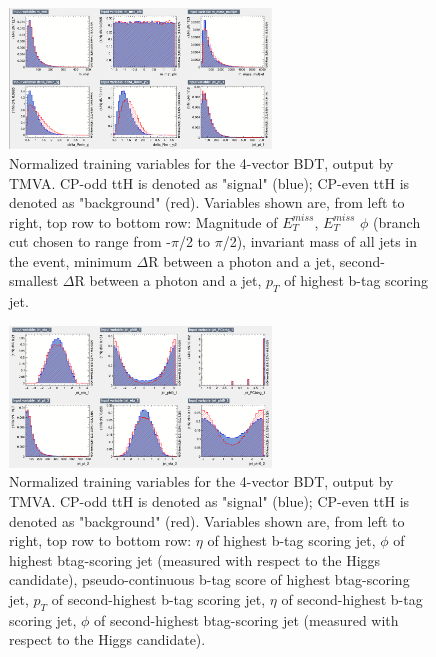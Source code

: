 \begin{figure}[htbp]
  \centering
  \includegraphics[width=0.62\textwidth]{figures/TMVABDTStudies/had-vbls4vec/had4vecvbls2.png}
  \caption{Normalized training variables for the 4-vector BDT, output by TMVA. CP-odd ttH is denoted as "signal" (blue); CP-even ttH is denoted as "background" (red). Variables shown are, from left to right, top row to bottom row: Magnitude of $E_T^{miss}$, $E_T^{miss}$ $\phi$ (branch cut chosen to range from -$\pi$/2 to $\pi$/2), invariant mass of all jets in the event, minimum $\Delta$R between a photon and a jet, second-smallest $\Delta$R between a photon and a jet, $p_{T}$ of highest b-tag scoring jet.}
  \label{fig:had4vecvbls2}
\end{figure}

\begin{figure}[htbp]
  \centering
  \includegraphics[width=0.62\textwidth]{figures/TMVABDTStudies/had-vbls4vec/had4vecvbls3.png}
  \caption{Normalized training variables for the 4-vector BDT, output by TMVA. CP-odd ttH is denoted as "signal" (blue); CP-even ttH is denoted as "background" (red). Variables shown are, from left to right, top row to bottom row: $\eta$ of highest b-tag scoring jet, $\phi$ of highest btag-scoring jet (measured with respect to the Higgs candidate), pseudo-continuous b-tag score of highest btag-scoring jet, $p_{T}$ of second-highest b-tag scoring jet, $\eta$ of second-highest b-tag scoring jet, $\phi$ of second-highest btag-scoring jet (measured with respect to the Higgs candidate).}
  \label{fig:had4vecvbls3}
\end{figure}

